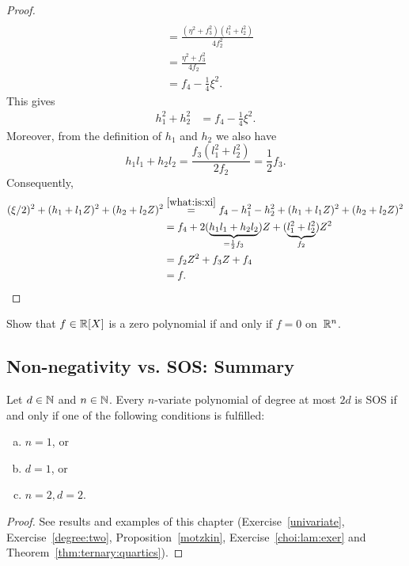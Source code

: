 \begin{proof}
\begin{align*}
		\\ & = \frac{(\eta^2 + f_3^2)(l_1^2 + l_2^2)}{4 f_2^2} 
		\\ & = \frac{\eta^2 + f_3^2}{4 f_2} 
		\\ & = f_4 - \frac{1}{4} \xi^2. 
	\end{align*}
	This gives
	\begin{align}
		h_1^2 + h_2^2 & = f_4 - \frac{1}{4} \xi^2. \label{what:is:xi}
	\end{align}
	Moreover, from the definition of $h_1$ and $h_2$ we also have 
	\[
	h_1 l_1 + h_2 l_2 = \frac{f_3 (l_1^2 + l_2^2)}{2 f_2} = \frac{1}{2} f_3.
	\]
	Consequently, 
	\begin{align*}
	(\xi/2)^2 + (h_1 + l_1 Z)^2 + (h_2 + l_2 Z)^2 & \stackrel{\eqref{what:is:xi}}{=} f_4 - h_1^2 - h_2^2 + (h_1 + l_1 Z)^2 + (h_2 + l_2 Z)^2 
	\\ & = f_4 + 2 (\underbrace{h_1 l_1 + h_2 l_2}_{=\frac{1}{2} f_3}) Z + (\underbrace{l_1^2 + l_2^2}_{f_2}) Z^2 
	\\ & = f_2 Z^2 + f_3 Z+ f_4 
	\\ & = f. \qedhere
	\end{align*}
\end{proof}

\begin{exercise}
	Show that $f \in \mathbb{R}[X]$ is a zero polynomial if and only if $f=0$ on~$\mathbb{R}^n$.
\end{exercise} 

\subsection{Non-negativity vs. SOS: Summary}

\begin{theorem}
	Let $d \in \mathbb{N}$ and $n \in \mathbb{N}$. Every $n$-variate  polynomial of degree at most $2d$ is SOS if and only if one of the following conditions is fulfilled:
	\begin{enumerate}[(a)]
		\item $n=1$, or
		\item $d=1$, or
		\item $n=2, d=2$.
	\end{enumerate}
\end{theorem}
\begin{proof}
	See results and examples of this chapter (Exercise~\ref{univariate}, Exercise~\ref{degree:two}, Proposition~\ref{motzkin}, Exercise~\ref{choi:lam:exer} and Theorem~\ref{thm:ternary:quartics}).
\end{proof}



